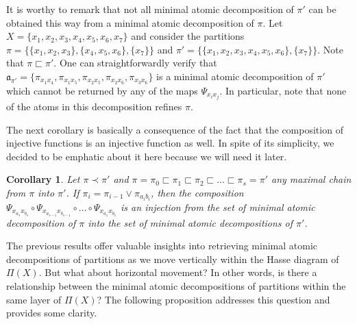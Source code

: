\documentclass[12pt]{extarticle}
\newtheorem{Corollary}{Corollary}
\begin{document}
	It is worthy to remark that not all minimal atomic decomposition of $\pi'$ can be obtained this way from a minimal atomic decomposition of $\pi$. Let $X=\{x_1,x_2,x_3,x_4,x_5,x_6,x_7\}$ and consider the partitions $\pi=\{\{x_1,x_2,x_3\},\{x_4,x_5,x_6\},\{x_7\}\}$  and $\pi'=\{\{x_1,x_2,x_3,x_4,x_5,x_6\},\{x_7\}\}$. Note that $\pi\sqsubset\pi'$. One can straightforwardly verify that $\mathfrak{a}_{\pi'}=\{\pi_{x_1x_4}, \pi_{x_1x_5},\pi_{x_2x_5}, \pi_{x_2x_6}, \pi_{x_3x_6}\}$ is a minimal atomic decomposition of $\pi'$ which cannot be returned by any of the maps $\Psi_{x_ix_j}$. In particular, note that none of the atoms in this decomposition refines $\pi$.
	
	The next corollary is basically a consequence of the fact that the composition of injective functions is an injective function as well. In spite of its simplicity, we decided to be emphatic about it here because we will need it later.
	
	
	\begin{Corollary}\label{compositionofaddinganatom} Let $\pi\prec\pi'$ and $\pi=\pi_0\sqsubset\pi_1\sqsubset\pi_2\sqsubset\ldots\sqsubset\pi_s=\pi'$ any maximal chain from $\pi$ into $\pi'$. If $\pi_{i}=\pi_{i-1} \vee \pi_{a_ib_i}$, then the composition $\Psi_{x_{a_s}x_{b_s}}\circ \Psi_{x_{a_{s-1}}x_{b_{s-1}}}\circ\ldots\circ \Psi_{x_{a_1}x_{b_1}}$ is an injection from the set of minimal atomic decomposition of $\pi$ into the set of minimal atomic decompositions of $\pi'$.
	\end{Corollary}
	
	The previous results offer valuable insights into retrieving minimal atomic decompositions of partitions as we move vertically within the Hasse diagram of $\Pi(X)$. But what about horizontal movement? In other words, is there a relationship between the minimal atomic decompositions of partitions within the same layer of $\Pi(X)$? The following proposition addresses this question and provides some clarity.
	
\end{document}
